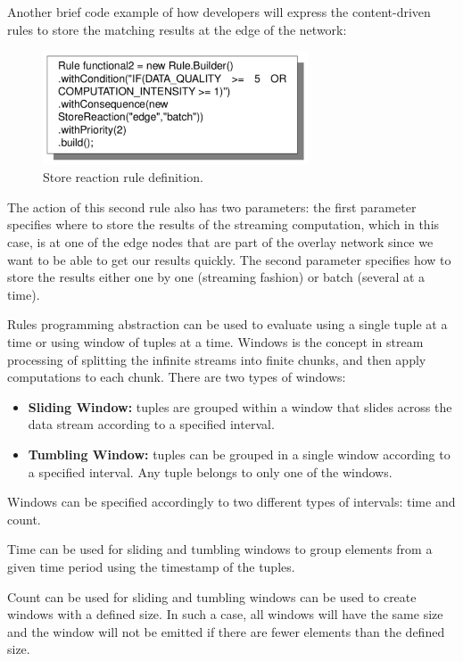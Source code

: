 Another brief code example of how developers will express the content-driven rules to store the matching results at the edge of the network:

\begin{figure}[h!]
  \centering
  \includegraphics[width=0.7\textwidth]{Figures/StoreReaction.pdf}
  \caption{Store reaction rule definition.}
  \label{fig:StoreReaction}
\end{figure}


The action of this second rule also has two parameters: the first parameter specifies where to store the results of the streaming computation, which in this case, is at one of the edge nodes that are part of the overlay network since we want to be able to get our results quickly. The second parameter specifies how to store the results either one by one (streaming fashion) or batch (several at a time).

Rules programming abstraction can be used to evaluate using a single tuple at a time or using window of tuples at a time. Windows is the concept in stream processing of splitting the infinite streams into finite chunks, and then apply computations to each chunk. There are two types of windows:

\begin{itemize}
    \item \textbf{Sliding Window:} tuples are grouped within a window that slides across the data stream according to a specified interval.
    \item \textbf{Tumbling Window:} tuples can be grouped in a single window according to a specified interval. Any tuple belongs to only one of the windows.
\end{itemize}

Windows can be specified accordingly to two different types of intervals: time and count.

Time can be used for sliding and tumbling windows to group elements from a given time period using the timestamp of the tuples. 

Count can be used for sliding and tumbling windows can be used to create windows with a defined size. In such a case, all windows will have the same size and the window will not be emitted if there are fewer elements than the defined size.

